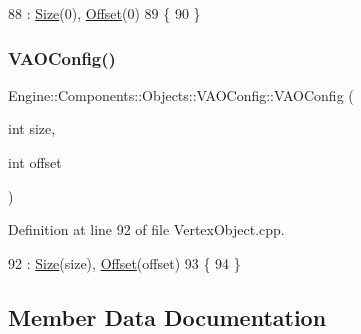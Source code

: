 \begin{DoxyCode}
88                                             : \mbox{\hyperlink{structEngine_1_1Components_1_1Objects_1_1VAOConfig_a1591984c2db527f1e17d8965039b9d9c}{Size}}(0), \mbox{\hyperlink{structEngine_1_1Components_1_1Objects_1_1VAOConfig_a6060677b7de418e6f1143a76ddd5ac98}{Offset}}(0)
89 \{
90 \}
\end{DoxyCode}
\mbox{\label{structEngine_1_1Components_1_1Objects_1_1VAOConfig_a6861c27437102022a1108036ddf30062}} 
\subsubsection{\texorpdfstring{V\+A\+O\+Config()}{VAOConfig()}\hspace{0.1cm}{\footnotesize\ttfamily [2/2]}}
{\footnotesize\ttfamily Engine\+::\+Components\+::\+Objects\+::\+V\+A\+O\+Config\+::\+V\+A\+O\+Config (\begin{DoxyParamCaption}\item[{int}]{size,  }\item[{int}]{offset }\end{DoxyParamCaption})}



Definition at line 92 of file Vertex\+Object.\+cpp.


\begin{DoxyCode}
92                                                                 : \mbox{\hyperlink{structEngine_1_1Components_1_1Objects_1_1VAOConfig_a1591984c2db527f1e17d8965039b9d9c}{Size}}(size), 
      \mbox{\hyperlink{structEngine_1_1Components_1_1Objects_1_1VAOConfig_a6060677b7de418e6f1143a76ddd5ac98}{Offset}}(offset)
93 \{
94 \}
\end{DoxyCode}


\subsection{Member Data Documentation}
\mbox{\label{structEngine_1_1Components_1_1Objects_1_1VAOConfig_a6060677b7de418e6f1143a76ddd5ac98}} 
